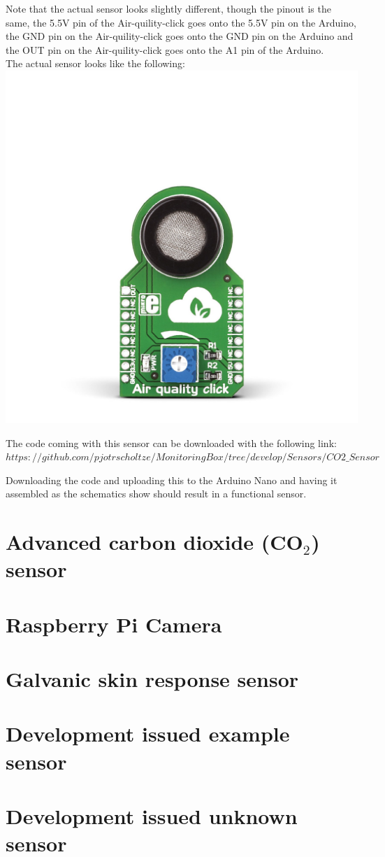 \documentclass{report}
\begin{document}
Note that the actual sensor looks slightly different, though the pinout is the same, the 5.5V pin of the Air-quility-click goes onto the 5.5V pin on the Arduino, the GND pin on the Air-quility-click  goes onto the GND pin on the Arduino and the OUT pin on the Air-quility-click goes onto the A1 pin of the Arduino. \\
The actual sensor looks like the following:\\

\includegraphics[scale=1]{images/air-quality-click-breakout.jpg} 


The code coming with this sensor can be downloaded with the following link: $ https://github.com/pjotrscholtze/MonitoringBox/tree/develop/Sensors/CO2\_Sensor $


Downloading the code and uploading this to the Arduino Nano and having it assembled as the schematics show should result in a functional sensor. 

\chapter{Advanced carbon dioxide (CO$_2$) sensor}

\chapter{Raspberry Pi Camera}

\chapter{Galvanic skin response sensor}

\chapter{Development issued example sensor}

\chapter{Development issued unknown sensor}
\end{document}
